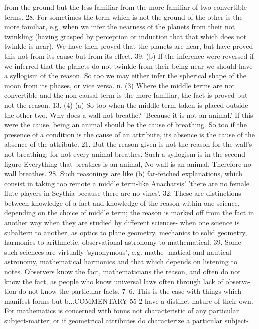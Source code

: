 {{{{{{{{{{{{{from the ground but the less familiar from the more familiar of
two convertible terms.
28. For sometimes the term which is not the ground of the
other is the more familiar, e.g. when we infer the nearness of the
planets from their not twinkling (having grasped by perception
or induction that that which does not twinkle is near). We have
then proved that the planets are near, but have proved this not
from its cause but from its effect.
39. (b) If the inference were reversed-if we inferred that the
planets do not twinkle from their being near-we should have
a syllogism of the reason.
So too we may either infer the spherical shape of the moon
from its phases, or vice versa.
n. (3) Where the middle terms are not convertible and the
non-causal term is the more familiar, the fact is proved but not
the reason.
13. (4) (a) So too when the middle term taken is placed outside
the other two. Why does a wall not breathe? 'Because it is not
an animal.' If this were the cause, being an animal should be the
cause of breathing. So too if the presence of a condition is the
cause of an attribute, its absence is the cause of the absence of
the attribute.
21. But the reason given is not the reason for the wall's not
breathing; for not every animal breathes. Such a syllogism is
in the second figure-Everything that breathes is an animal, No
wall is an animal, Therefore no wall breathes.
28. Such reasonings are like (b) far-fetched explanations, which
consist in taking too remote a middle term-like Anacharsis' 'there
are no female flute-players in Scythia because there are no vines'.
32. These are distinctions between knowledge of a fact and
knowledge of the reason within one science, depending on the
choice of middle term; the reason is marked off from the fact
in another way when they are studied by different sciences-
when one science is subaltern to another, as optics to plane
geometry, mechanics to solid geometry, harmonics to arithmetic,
observational astronomy to mathematical.
39. Some such sciences are virtually 'synonymous', e.g. mathe-
matical and nautical astronomy, mathematical harmonics and
that which depends on listening to notes. Observers know the
fact, mathematicians the reason, and often do not know the fact,
as people who know universal laws often through lack of observa-
tion do not know the particular facts.
7~6. This is the case with things which manifest forms but
b...COMMENTARY
55 2
have a distinct nature of their own. For mathematics is concerned
with fonns not characteristic of any particular subject-matter;
or if geometrical attributes do characterize a particular subject-
}}}}}}}}}}}}}
